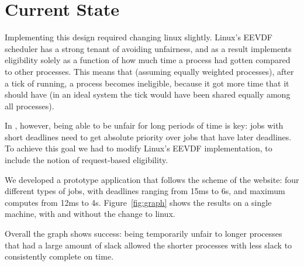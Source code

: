 \section{Current State}

Implementing this design required changing linux slightly. Linux's EEVDF
scheduler has a strong tenant of avoiding unfairness, and as a result implements
eligibility solely as a function of how much time a process had gotten compared
to other processes. This means that (assuming equally weighted processes), after
a tick of running, a process becomes ineligible, because it got more time that
it should have (in an ideal system the tick would have been shared equally among
all processes).

In \sysname, however, being able to be unfair for long periods of time is key:
jobs with short deadlines need to get absolute priority over jobs that have
later deadlines. To achieve this goal we had to modify Linux's EEVDF
implementation, to include the notion of request-based eligibility.

We developed a prototype application that follows the scheme of the website:
four different types of jobs, with deadlines ranging from 15ms to 6s, and
maximum computes from 12ms to 4s. Figure~\ref{fig:graph} shows the results on a
single machine, with and without the change to linux. 

Overall the graph shows success: being temporarily unfair to longer processes
that had a large amount of slack allowed the shorter processes with less slack
to consistently complete on time.